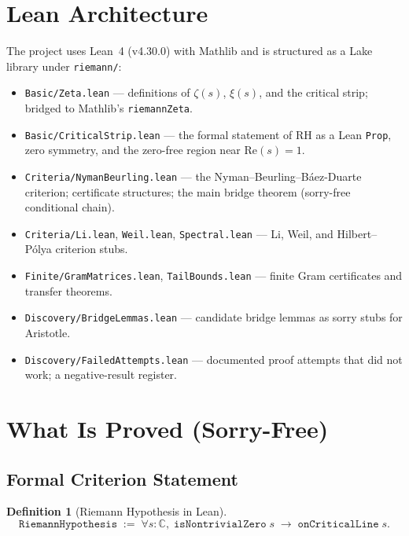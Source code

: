 \documentclass[11pt,a4paper]{article}
\newtheorem{definition}[theorem]{Definition}
\begin{document}
\section{Lean Architecture}

The project uses Lean~4 (v4.30.0) with Mathlib and is structured as a Lake
library under \texttt{riemann/}:

\begin{itemize}
  \item \texttt{Basic/Zeta.lean} --- definitions of $\zeta(s)$, $\xi(s)$, and
        the critical strip; bridged to Mathlib's \texttt{riemannZeta}.
  \item \texttt{Basic/CriticalStrip.lean} --- the formal statement of RH as a
        Lean \texttt{Prop}, zero symmetry, and the zero-free region near
        $\mathrm{Re}(s) = 1$.
  \item \texttt{Criteria/NymanBeurling.lean} --- the Nyman--Beurling--Báez-Duarte
        criterion; certificate structures; the main bridge theorem
        (sorry-free conditional chain).
  \item \texttt{Criteria/Li.lean}, \texttt{Weil.lean}, \texttt{Spectral.lean}
        --- Li, Weil, and Hilbert--Pólya criterion stubs.
  \item \texttt{Finite/GramMatrices.lean}, \texttt{TailBounds.lean} ---
        finite Gram certificates and transfer theorems.
  \item \texttt{Discovery/BridgeLemmas.lean} --- candidate bridge lemmas as
        sorry stubs for Aristotle.
  \item \texttt{Discovery/FailedAttempts.lean} --- documented proof attempts
        that did not work; a negative-result register.
\end{itemize}

\section{What Is Proved (Sorry-Free)}

\subsection{Formal Criterion Statement}

\begin{definition}[Riemann Hypothesis in Lean]
\[
  \texttt{RiemannHypothesis} \;:=\;
  \forall s : \mathbb{C},\;
  \texttt{isNontrivialZero}\;s \;\to\; \texttt{onCriticalLine}\;s.
\]
\end{definition}
\end{document}
